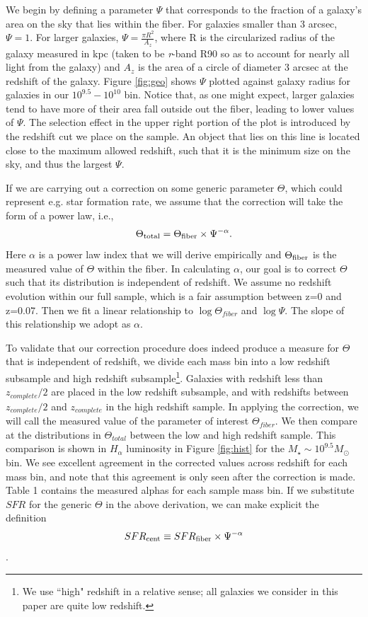 \documentclass[iop]{emulateapj}
\begin{document}
We begin by defining a parameter $\Psi$ that corresponds to the fraction of a galaxy's area on the sky that lies within the fiber. For galaxies smaller than 3 arcsec, $\Psi = 1$. For larger galaxies, $\Psi = \frac{\pi R^2}{A_z}$, where R is the circularized radius of the galaxy measured in kpc (taken to be \textit{r}-band R90 so as to account for nearly all light from the galaxy) and $A_z$ is the area of a circle of diameter 3 arcsec at the redshift of the galaxy. Figure \ref{fig:geo} shows $\Psi$ plotted against galaxy radius for galaxies in our $10^{9.5}-10^{10}$ bin. Notice that, as one might expect, larger galaxies tend to have more of their area fall outside out the fiber, leading to lower values of $\Psi$. The selection effect in the upper right portion of the plot is introduced by the redshift cut we place on the sample. An object that lies on this line is located close to the maximum allowed redshift, such that it is the minimum size on the sky, and thus the largest $\Psi$. 

If we are carrying out a correction on some generic parameter $\Theta$, which could represent e.g. star formation rate, we assume that the correction will take the form of a power law, i.e., $$\Theta_{\rm total} = \Theta_{\rm fiber} \times \Psi^{-\alpha}.$$ Here $\alpha$ is a power law index that we will derive empirically and $\Theta_{\rm fiber}$ is the measured value of $\Theta$ within the fiber. In calculating $\alpha$, our goal is to correct $\Theta$ such that its distribution is independent of redshift. We assume no redshift evolution within our full sample, which is a fair assumption between z=0 and z=0.07. Then we fit a linear relationship to $\log \Theta_{fiber}$ and $\log \Psi$. The slope of this relationship we adopt as $\alpha$.

To validate that our correction procedure does indeed produce a measure for $\Theta$ that is independent of redshift, we divide each mass bin into a low redshift subsample and high redshift subsample\footnote{We use ``high" redshift in a relative sense; all galaxies we consider in this paper are quite low redshift.}. Galaxies with redshift less than $z_{complete}/2$ are placed in the low redshift subsample, and with redshifts between $z_{complete}/2$ and  $z_{complete}$ in the high redshift sample. In applying the correction, we will call the measured value of the parameter of interest $\Theta_{fiber}$. We then compare at the distributions in $\Theta_{total}$ between the low and high redshift sample. This comparison is shown in $H_\alpha$ luminosity in Figure \ref{fig:hist} for the $M_\star \sim 10^{9.5} M_{\odot}$ bin. We see excellent agreement in the corrected values across redshift for each mass bin, and note that this agreement is only seen after the correction is made. Table 1  contains the measured alphas for each sample mass bin. If we substitute $SFR$ for the generic $\Theta$ in the above derivation, we can make explicit the definition $$SFR_{\rm cent} \equiv SFR_{\rm fiber} \times \Psi^{-\alpha}$$.
\end{document}
